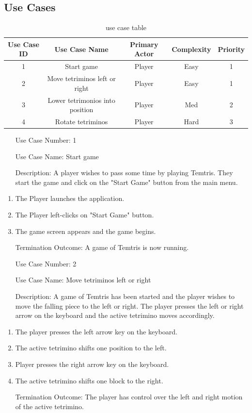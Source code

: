 \documentclass[10pt,conference,onecolumn,compsoc]{IEEEtran}
\begin{document}
\subsection{Use Cases}
\begin{table}[h!]
\centering
\begin{tabular}{|c|c|c|c|c|}
\hline
Use Case ID & Use Case Name & Primary Actor & Complexity & Priority \\
\hline \hline
1 & Start game & Player & Easy & 1\\
\hline
2 & Move tetriminos left or right & Player & Easy & 1\\
\hline
3 & Lower tetrimonios into position & Player & Med & 2\\
\hline
4 & Rotate tetriminos & Player & Hard & 3\\
\hline
\end{tabular}
\caption{use case table}
\label{tab:useCaseIndex}
\end{table}

\begin{itemize}
\item[Use Case Number:] 1
\item[Use Case Name:] Start game
\item[Description:] A player wishes to pass some time by playing Temtris. They start the game and click on the "Start Game" button from the main menu.
\end{itemize}
\begin{enumerate}
\item The Player launches the application.
\item The Player left-clicks on "Start Game" button.
\item The game screen appears and the game begins.
\item[Termination Outcome:] A game of Temtris is now running.
\end{enumerate}
\medskip
 
\begin{itemize}
\item[Use Case Number:] 2
\item[Use Case Name:] Move tetriminos left or right
\item[Description:] A game of Temtris has been started and the player wishes to move the falling piece to the left or right. The player presses the left or right arrow on the keyboard and the active tetrimino moves accordingly.
\end{itemize}
\begin{enumerate}
\item The player presses the left arrow key on the keyboard.
\item The active tetrimino shifts one position to the left.
\item Player presses the right arrow key on the keyboard.
\item The active tetrimino shifts one block to the right.
\item[Termination Outcome:] The player has control over the left and right motion of the active tetrimino.
\end{enumerate}
\medskip
\end{document}
